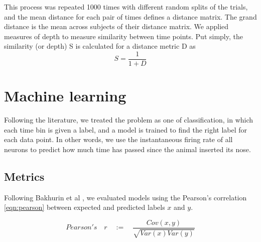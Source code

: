     This process was repeated 1000 times with different random splits of the trials, and the mean distance for each pair of times defines a distance matrix. The grand distance is the mean across subjects of their distance matrix. We applied measures of depth \cite{mosler2013depth} to measure similarity between time points. Put simply, the similarity (or depth) S is calculated for a distance metric D as 
    \begin{equation*}
    S = \frac{1}{1+D}
    \label{eqn:depth}
    \end{equation*}

\section{Machine learning}
    Following the literature\cite{bakhurin2017differential}, we treated the problem as one of classification, in which each time bin is given a label, and a model is trained to find the right label for each data point. In other words, we use the instantaneous firing rate of all neurons to predict how much time has passed since the animal inserted its nose.
    
    \subsection{Metrics}
    Following Bakhurin et al \cite{bakhurin2017differential}, we evaluated models using the Pearson's correlation \eqref{eqn:pearson} between expected and predicted labels $x$ and $y$. 
    
    
    \begin{equation}
        Pearson's\quad r  \quad :=  \quad
            \frac{Cov(x,y)}{\sqrt{Var(x)Var(y)}}
        \label{eqn:pearson}
    \end{equation}
    
    
